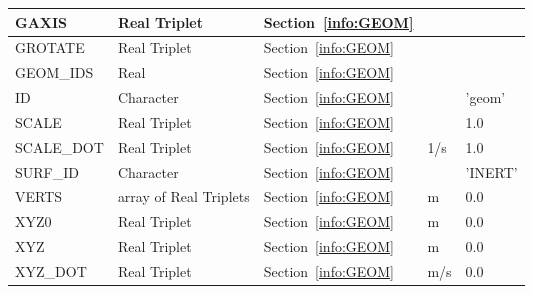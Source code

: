 \documentclass[12pt]{article}
\begin{document}
\begin{longtable}{@{\extracolsep{\fill}}|l|l|l|l|l|}
{\ct GAXIS}        & Real Triplet           & Section~\ref{info:GEOM}            &           &                          \\ \hline
{\ct GROTATE}      & Real Triplet           & Section~\ref{info:GEOM}            &           &                          \\ \hline
{\ct GEOM\_IDS}    & Real                   & Section~\ref{info:GEOM}            &           &                          \\ \hline
{\ct ID}           & Character              & Section~\ref{info:GEOM}            &           &   {\ct 'geom'}           \\ \hline
{\ct SCALE}        & Real Triplet           & Section~\ref{info:GEOM}            &           &   1.0                    \\ \hline
{\ct SCALE\_DOT}   & Real Triplet           & Section~\ref{info:GEOM}            &  1/s      &   1.0                    \\ \hline
{\ct SURF\_ID}     & Character              & Section~\ref{info:GEOM}            &           &  {\ct 'INERT'}           \\ \hline
{\ct VERTS}        & array of Real Triplets & Section~\ref{info:GEOM}            &   m       &   0.0                    \\ \hline
{\ct XYZ0}         & Real Triplet           & Section~\ref{info:GEOM}            &   m       &   0.0                    \\ \hline
{\ct XYZ}          & Real Triplet           & Section~\ref{info:GEOM}            &   m       &   0.0                    \\ \hline
{\ct XYZ\_DOT}     & Real Triplet           & Section~\ref{info:GEOM}            &   m/s     &   0.0                    \\ \hline

\end{longtable}


\vspace{\baselineskip}
\end{document}
